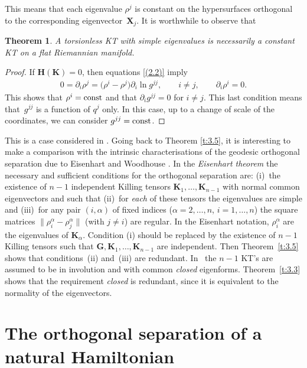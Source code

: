 \documentclass[pdftex]{sigma}
\def\bs{\boldsymbol}
\numberwithin{equation}{section}
\newtheorem{Theorem}{Theorem}[section]
 { \theoremstyle{definition}
\newtheorem{Notation}[Theorem]{Notation}
\newtheorem{Example}[Theorem]{Example}
\newtheorem{Remark}[Theorem]{Remark}
\newtheorem{Remarks}[Theorem]{Remarks}
 }
\begin{document}
This means that each eigenvalue $\rho^j$ is constant on the hypersurfaces orthogonal to the corresponding eigenvector~$\bs X_j$. It is worthwhile to observe that

\begin{Theorem}
A torsionless KT with simple eigenvalues is necessarily a constant KT on a flat Riemannian manifold.
\end{Theorem}

\begin{proof}
If $\bs H(\bs K)=0$, then equations \eqref{(2.2)} imply
\begin{gather*}
0=\partial_i\rho^j=\big(\rho^i-\rho^j\big) \partial_i\ln g^{jj},\qquad i\neq j, \qquad \partial_i\rho^i=0.
\end{gather*}
This shows that $\rho^i={\rm const}$ and that $\partial_ig^{jj}=0$ for $i\neq j$. This last condition means that~$g^{jj}$ is a function of $q^j$ only. In this case, up to a change of scale of the coordinates, we can consider $g^{jj}={\rm const}$.
\end{proof}

This is a case considered in \cite{Bruce-McL-Smirnov-2001}. Going back to Theorem \ref{t:3.5}, it is interesting to make a comparison with the intrinsic characterisations of the geodesic orthogonal separation due to Eisenhart \cite{Eisenhart-1934,Eisenhart-1949} and Woodhouse \cite{Woodhouse-1975}. In the {\it Eisenhart theorem} \cite[p.~289]{Eisenhart-1934} the necessary and suf\/f\/icient conditions for the orthogonal separation are: (i)~the existence of $n-1$ independent Killing tensors $\bs K_1,\ldots, \bs K_{n-1}$ with normal common eigenvectors and such that (ii)~for {\it each} of these tensors the eigenvalues are simple and (iii)~for any pair $(i,\alpha)$ of f\/ixed indices ($\alpha =2,\ldots, n$, $i=1,\ldots, n$) the square matrices $\|\rho_i^\alpha-\rho_j^\alpha\|$ (with $j\neq i$) are regular. In the Eisenhart notation, $\rho_i^\alpha$ are the eigenvalues of $\bs K_\alpha$. Condition (i) should be replaced by the existence of $n-1$ Killing tensors such that $\bs G,\bs K_1,\ldots, \bs K_{n-1}$ are independent. Then Theorem~\ref{t:3.5} shows that conditions~(ii) and~(iii) are redundant. In~\cite[Theorem~4.2]{Woodhouse-1975} the $n-1$ KT's are assumed to be in involution and with common {\it closed} eigenforms. Theorem~\ref{t:3.3} shows that the requirement {\it closed} is redundant, since it is equivalent to the normality of the eigenvectors.

\section{The orthogonal separation of a natural Hamiltonian}\label{section4}
\end{document}
